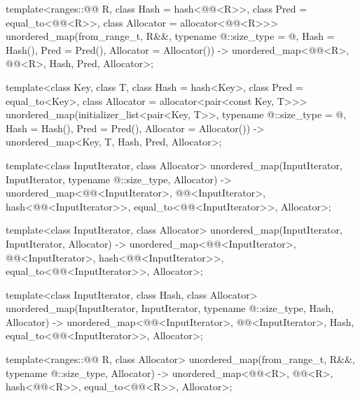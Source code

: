 \begin{codeblock}
{  template<ranges::@@ R, class Hash = hash<@@<R>>,
           class Pred = equal_to<@@<R>>,
           class Allocator = allocator<@@<R>>>
    unordered_map(from_range_t, R&&, typename @\seebelow@::size_type = @\seebelow@,
                  Hash = Hash(), Pred = Pred(), Allocator = Allocator())
      -> unordered_map<@@<R>, @@<R>, Hash, Pred, Allocator>;

  template<class Key, class T, class Hash = hash<Key>,
           class Pred = equal_to<Key>, class Allocator = allocator<pair<const Key, T>>>
    unordered_map(initializer_list<pair<Key, T>>,
                  typename @\seebelow@::size_type = @\seebelow@, Hash = Hash(),
                  Pred = Pred(), Allocator = Allocator())
      -> unordered_map<Key, T, Hash, Pred, Allocator>;

  template<class InputIterator, class Allocator>
    unordered_map(InputIterator, InputIterator, typename @\seebelow@::size_type, Allocator)
      -> unordered_map<@@<InputIterator>, @@<InputIterator>,
                       hash<@@<InputIterator>>,
                       equal_to<@@<InputIterator>>, Allocator>;

  template<class InputIterator, class Allocator>
    unordered_map(InputIterator, InputIterator, Allocator)
      -> unordered_map<@@<InputIterator>, @@<InputIterator>,
                       hash<@@<InputIterator>>,
                       equal_to<@@<InputIterator>>, Allocator>;

  template<class InputIterator, class Hash, class Allocator>
    unordered_map(InputIterator, InputIterator, typename @\seebelow@::size_type, Hash, Allocator)
      -> unordered_map<@@<InputIterator>, @@<InputIterator>, Hash,
                       equal_to<@@<InputIterator>>, Allocator>;

  template<ranges::@@ R, class Allocator>
    unordered_map(from_range_t, R&&, typename @\seebelow@::size_type, Allocator)
      -> unordered_map<@@<R>, @@<R>, hash<@@<R>>,
                       equal_to<@@<R>>, Allocator>;

}
\end{codeblock}
